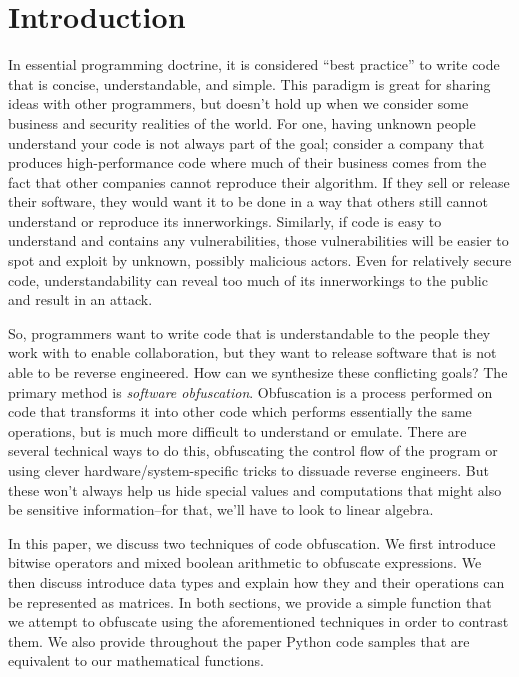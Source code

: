 \section{Introduction}
In essential programming doctrine, it is considered ``best practice'' to write code that
is concise, understandable, and simple. This paradigm is great for sharing ideas
with other programmers, but doesn't hold up when we consider some business and
security realities of the world. For one, having unknown people understand
your code is not always part of the goal; consider a company that produces
high-performance code where much of their business comes from the fact that
other companies cannot reproduce their algorithm. If they sell or
release their software, they would want it to be done in a way that others still
cannot understand or reproduce its innerworkings.
Similarly, if code is easy to understand and contains any vulnerabilities,
those vulnerabilities will be easier to spot and exploit by unknown, possibly
malicious actors. Even for relatively secure code, understandability can reveal
too much of its innerworkings to the public and result in an attack.
\par So, programmers want to write code that is understandable to the people
they work with to enable collaboration, but they want to release software that is not
able to be reverse engineered. How can we synthesize
these conflicting goals? The primary method is {\itshape software obfuscation}.
Obfuscation is a process performed on code that transforms it into other code
which performs essentially the same operations, but is much more difficult to
understand or emulate. There are several technical ways to do this, obfuscating
the control flow of the program or using clever hardware/system-specific tricks
to dissuade reverse engineers. But these won't always help us hide special values
and computations that might also be sensitive information--for that, we'll have to
look to linear algebra.

In this paper, we discuss two techniques of code obfuscation. We first
introduce bitwise operators and mixed boolean arithmetic to obfuscate
expressions. We then discuss introduce data types and explain how they and
their operations can be represented as matrices. In both sections, we provide a
simple function that we attempt to obfuscate using the aforementioned
techniques in order to contrast them. We also provide throughout the paper
Python code samples that are equivalent to our mathematical functions.
